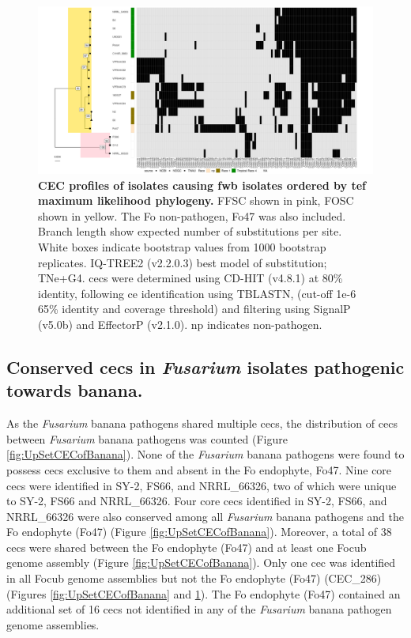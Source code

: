 \begin{figure}
    \centering
    \includegraphics[width=\textwidth]{Figures/HeatmapAndPhylo_BananaPathOnly.png}
    \captionsetup{width=24cm}
    \caption[CEC profiles of isolates  causing \acl{fwb} isolates ordered by maximum likelihood phylogeny.]{\textbf{CEC profiles of isolates  causing \acl{fwb} isolates ordered by \ac{tef} maximum likelihood phylogeny.} \ac{FFSC} shown in pink, \ac{FOSC} shown in yellow. The \ac{Fo} non-pathogen, Fo47 was also included. Branch length show expected number of substitutions per site. White boxes indicate bootstrap values from 1000 bootstrap replicates. IQ-TREE2 (v2.2.0.3) best model of substitution; TNe+G4. \Acp{cec} were determined using CD-HIT (v4.8.1) at 80\% identity, following \ac{ce} identification using TBLASTN, (cut-off 1e-6 65\% identity and coverage threshold) and filtering using SignalP (v5.0b) and EffectorP (v2.1.0). np indicates non-pathogen.}
    \label{fig:MaeiHeatmap-banana}
\end{figure}

\subsection{Conserved \aclp{cec} in \textit{Fusarium} isolates pathogenic towards banana.} 

As the \textit{Fusarium} banana pathogens shared multiple \acp{cec}, the distribution of \acp{cec} between \textit{Fusarium} banana pathogens was counted (Figure \ref{fig:UpSetCECofBanana}). None of the \textit{Fusarium} banana pathogens were found to possess \acp{cec} exclusive to them and absent in the \ac{Fo} endophyte, Fo47. Nine core \acp{cec} were identified in SY-2, FS66, and NRRL\_66326, two of which were unique to SY-2,  FS66 and NRRL\_66326. Four core \acp{cec} identified in SY-2, FS66, and NRRL\_66326 were also conserved among all \textit{Fusarium} banana pathogens and the \ac{Fo} endophyte (Fo47) (Figure \ref{fig:UpSetCECofBanana}). Moreover, a total of 38 \acp{cec} were shared between the \ac{Fo} endophyte (Fo47) and at least one \ac{Focub} genome assembly (Figure \ref{fig:UpSetCECofBanana}). Only one \ac{cec} was identified in all \ac{Focub} genome assemblies but not the \ac{Fo} endophyte (Fo47) (CEC\_286) (Figures \ref{fig:UpSetCECofBanana} and \ref{fig:MaeiHeatmap-banana}). The \ac{Fo} endophyte (Fo47) contained an additional set of 16 \acp{cec} not identified in any of the \textit{Fusarium} banana pathogen genome assemblies.

